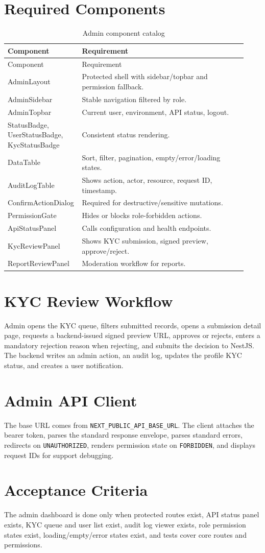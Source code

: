 \section*{Required Components}
\begin{longtable}{p{0.25\linewidth}p{0.68\linewidth}}
\caption{Admin component catalog}\\
\toprule
Component & Requirement \\
\midrule
\endfirsthead
\toprule
Component & Requirement \\
\midrule
\endhead
AdminLayout & Protected shell with sidebar/topbar and permission fallback. \\
AdminSidebar & Stable navigation filtered by role. \\
AdminTopbar & Current user, environment, API status, logout. \\
StatusBadge, UserStatusBadge, KycStatusBadge & Consistent status rendering. \\
DataTable & Sort, filter, pagination, empty/error/loading states. \\
AuditLogTable & Shows action, actor, resource, request ID, timestamp. \\
ConfirmActionDialog & Required for destructive/sensitive mutations. \\
PermissionGate & Hides or blocks role-forbidden actions. \\
ApiStatusPanel & Calls configuration and health endpoints. \\
KycReviewPanel & Shows KYC submission, signed preview, approve/reject. \\
ReportReviewPanel & Moderation workflow for reports. \\
\bottomrule
\end{longtable}

\section*{KYC Review Workflow}
Admin opens the KYC queue, filters submitted records, opens a submission detail page, requests a backend-issued signed preview URL, approves or rejects, enters a mandatory rejection reason when rejecting, and submits the decision to NestJS. The backend writes an admin action, an audit log, updates the profile KYC status, and creates a user notification.

\section*{Admin API Client}
The base URL comes from \texttt{NEXT\_PUBLIC\_API\_BASE\_URL}. The client attaches the bearer token, parses the standard response envelope, parses standard errors, redirects on \texttt{UNAUTHORIZED}, renders permission state on \texttt{FORBIDDEN}, and displays request IDs for support debugging.

\section*{Acceptance Criteria}
The admin dashboard is done only when protected routes exist, API status panel exists, KYC queue and user list exist, audit log viewer exists, role permission states exist, loading/empty/error states exist, and tests cover core routes and permissions.
